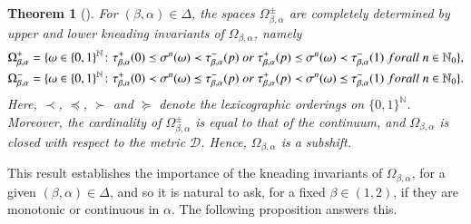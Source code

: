 \documentclass[a4paper,reqno,10pt]{amsart}
\newtheorem{theorem}{Theorem}[section]
\begin{document}
    \begin{theorem}[{\cite{P1960,HS:1990,AM:1996,KS:2012,BHV:2011}}]\label{thm:Structure}
        For $(\beta, \alpha) \in \Delta$, the spaces $\Omega_{\beta, \alpha}^{\pm}$ are completely determined by upper and lower kneading invariants of $\Omega_{\beta, \alpha}$, namely
            \begin{align*}
                \Omega_{\beta, \alpha}^{+} &= \{ \omega \in \{ 0, 1\}^{\mathbb{N}} \colon \tau_{\beta, \alpha}^{+}(0) \preceq \sigma^{n}(\omega) \prec \tau_{\beta, \alpha}^{-}(p) \; \textup{or} \; \tau_{\beta, \alpha}^{+}(p) \preceq \sigma^{n}(\omega) \prec \tau_{\beta, \alpha}^{-}(1) \; \textup{for all} \; n \in \mathbb{N}_{0} \},\\
                \Omega_{\beta, \alpha}^{-} &= \{ \omega \in \{ 0, 1\}^{\mathbb{N}} \colon \tau_{\beta, \alpha}^{+}(0) \prec  \sigma^{n}(\omega) \preceq \tau_{\beta, \alpha}^{-}(p) \; \textup{or} \; \tau_{\beta, \alpha}^{+}(p) \prec \sigma^{n}(\omega) \preceq \tau_{\beta, \alpha}^{-}(1) \; \textup{for all} \; n \in \mathbb{N}_{0} \}.
            \end{align*}
        Here, $\prec$, $\preceq$, $\succ$ and $\succeq$ denote the lexicographic orderings on $\{ 0 ,1\}^{\mathbb{N}}$.  Moreover, the cardinality of $\Omega_{\beta, \alpha}^{\pm}$ is equal to that of the continuum, and $\Omega_{\beta, \alpha}$ is closed with respect to the metric $\mathscr{D}$. Hence, $\Omega_{\beta, \alpha}$ is a subshift.
    \end{theorem}

This result establishes the importance of the kneading invariants of $\Omega_{\beta, \alpha}$, for a given $(\beta, \alpha) \in \Delta$, and so it is natural to ask, for a fixed $\beta \in (1, 2)$, if they are monotonic or continuous in $\alpha$.  The following proposition answers this.
\end{document}
